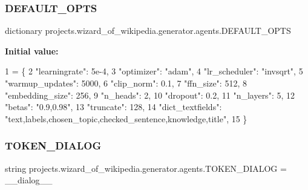\subsubsection{\texorpdfstring{D\+E\+F\+A\+U\+L\+T\+\_\+\+O\+P\+TS}{DEFAULT\_OPTS}}
{\footnotesize\ttfamily dictionary projects.\+wizard\+\_\+of\+\_\+wikipedia.\+generator.\+agents.\+D\+E\+F\+A\+U\+L\+T\+\_\+\+O\+P\+TS}

{\bfseries Initial value\+:}
\begin{DoxyCode}
1 =  \{
2     \textcolor{stringliteral}{"learningrate"}: 5e-4,
3     \textcolor{stringliteral}{"optimizer"}: \textcolor{stringliteral}{"adam"},
4     \textcolor{stringliteral}{"lr\_scheduler"}: \textcolor{stringliteral}{"invsqrt"},
5     \textcolor{stringliteral}{"warmup\_updates"}: 5000,
6     \textcolor{stringliteral}{"clip\_norm"}: 0.1,
7     \textcolor{stringliteral}{"ffn\_size"}: 512,
8     \textcolor{stringliteral}{"embedding\_size"}: 256,
9     \textcolor{stringliteral}{"n\_heads"}: 2,
10     \textcolor{stringliteral}{"dropout"}: 0.2,
11     \textcolor{stringliteral}{"n\_layers"}: 5,
12     \textcolor{stringliteral}{"betas"}: \textcolor{stringliteral}{"0.9,0.98"},
13     \textcolor{stringliteral}{"truncate"}: 128,
14     \textcolor{stringliteral}{"dict\_textfields"}: \textcolor{stringliteral}{"text,labels,chosen\_topic,checked\_sentence,knowledge,title"},
15 \}
\end{DoxyCode}
\mbox{\label{namespaceprojects_1_1wizard__of__wikipedia_1_1generator_1_1agents_a52f7b89b75c258efe22e8add9c970b75}} 
\subsubsection{\texorpdfstring{T\+O\+K\+E\+N\+\_\+\+D\+I\+A\+L\+OG}{TOKEN\_DIALOG}}
{\footnotesize\ttfamily string projects.\+wizard\+\_\+of\+\_\+wikipedia.\+generator.\+agents.\+T\+O\+K\+E\+N\+\_\+\+D\+I\+A\+L\+OG = \textquotesingle{}\+\_\+\+\_\+dialog\+\_\+\+\_\+\textquotesingle{}}

